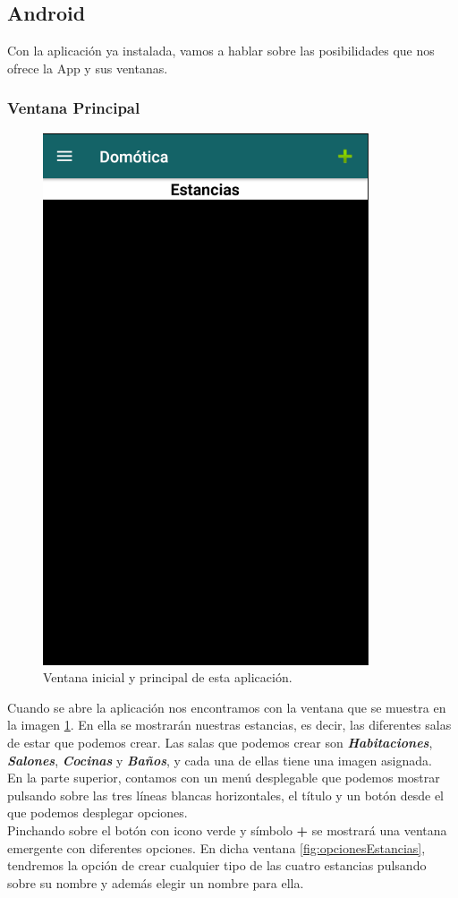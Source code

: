 \subsection{Android}\label{sec:manualAndroid}

Con la aplicación ya instalada, vamos a hablar sobre las posibilidades que nos ofrece la App y sus ventanas.

\subsubsection{Ventana Principal}

\begin{figure}[h!]
	\centering
	\includegraphics[width=0.35\linewidth]{img/ventanaPrincipal}
	\caption{Ventana inicial y principal de esta aplicación.}
	\label{fig:ventanaPrincipal}
\end{figure}

Cuando se abre la aplicación nos encontramos con la ventana que se muestra en la imagen \ref{fig:ventanaPrincipal}. En ella se mostrarán nuestras estancias, es decir, las diferentes salas de estar que podemos crear. Las salas que podemos crear son \textit{\textbf{Habitaciones}}, \textit{\textbf{Salones}}, \textit{\textbf{Cocinas}} y \textit{\textbf{Baños}}, y cada una de ellas tiene una imagen asignada. \\
En la parte superior, contamos con un menú desplegable que podemos mostrar pulsando sobre las tres líneas blancas horizontales, el título y un botón desde el que podemos desplegar opciones.\\
Pinchando sobre el botón con icono verde y símbolo \textbf{+} se mostrará una ventana emergente con diferentes opciones. En dicha ventana \ref{fig:opcionesEstancias}, tendremos la opción de crear cualquier tipo de las cuatro estancias pulsando sobre su nombre y además elegir un nombre para ella. \\

